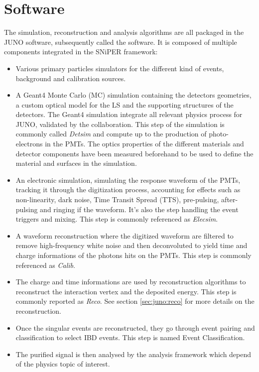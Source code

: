 \documentclass[../main.tex]{subfiles}
\begin{document}
\section{Software}
\label{sec:juno:software}

The simulation, reconstruction and analysis algorithms are all packaged in the JUNO software, subsequently called the software.
It is composed of multiple components integrated in the SNiPER \cite{lin_application_2017} framework:

\begin{itemize}
  \item Various primary particles simulators for the different kind of events, background and calibration sources.
  \item A Geant4 \cite{agostinelli_geant4simulation_2003, allison_geant4_2006, allison_recent_2016} Monte Carlo (MC) simulation containing the detectors geometries, a custom optical model for the LS and the supporting structures of the detectors. The Geant4 simulation integrate all relevant physics process for JUNO, validated by the collaboration. This step of the simulation is commonly called \textit{Detsim} and compute up to the production of photo-electrons in the PMTs. The optics properties of the different materials and detector components have been measured beforehand to be used to define the material and surfaces in the simulation.
  \item An electronic simulation, simulating the response waveform of the PMTs, tracking it through the digitization process, accounting for effects such as non-linearity, dark noise, Time Transit Spread (TTS), pre-pulsing, after-pulsing and ringing if the waveform. It's also the step handling the event triggers and mixing. This step is commonly referenced as \textit{Elecsim}.
  \item A waveform reconstruction where the digitized waveform are filtered to remove high-frequency white noise and then deconvoluted to yield time and charge informations of the photons hits on the PMTs. This step is commonly referenced as \textit{Calib}.
  \item The charge and time informations are used by reconstruction algorithms to reconstruct the interaction vertex and the deposited energy. This step is commonly reported as \textit{Reco}. See section \ref{sec:juno:reco} for more details on the reconstruction.
  \item Once the singular events are reconstructed, they go through event pairing and classification to select IBD events. This step is named Event Classification.
  \item The purified signal is then analysed by the analysis framework which depend of the physics topic of interest.
\end{itemize}
\end{document}
